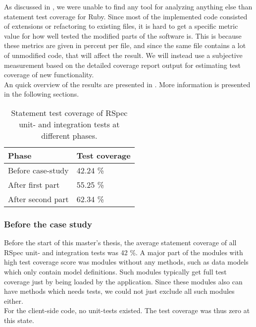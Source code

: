 
As discussed in , we were unable to find
any tool for analyzing anything else than statement test coverage for
Ruby. Since most of the implemented code consisted of extensions or
refactoring to existing files, it is hard to get a specific metric value
for how well tested the modified parts of the software is. This is
because these metrics are given in percent per file, and since the same
file contains a lot of unmodified code, that will affect the result. We
will instead use a subjective measurement based on the detailed coverage
report output for estimating test coverage of new functionality.\\


An quick overview of the results are presented in
. More information is presented in the following
sections.\\

\begin{table}[t]
    \centering
    \begin{tabular}{l l}
        Phase & Test coverage\\
        \hline
        Before case-study & 42.24 \%\\
        After first part  & 55.25 \%\\
        After second part & 62.34 \%\\
    \end{tabular}
    \caption{ Statement test coverage of RSpec unit- and integration tests at different phases. }
    \label{tab:unit_coverage}
\end{table}

\subsubsection{Before the case study}

Before the start of this master's thesis, the average statement coverage
of all RSpec unit- and integration tests was 42 \%. A major part of
the modules with high test coverage score was modules without any
methods, such as data models which only contain model definitions. Such
modules typically get full test coverage just by being loaded by the
application. Since these modules also can have methods which needs
tests, we could not just exclude all such modules either.\\

For the client-side code, no unit-tests existed. The test coverage was
thus zero at this state.\\


